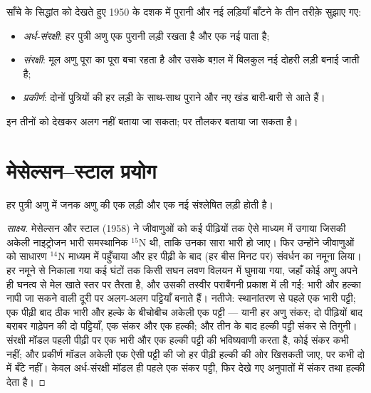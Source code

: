 \begin{example}[तीन संभव नतीजे]\label{ex:g11:dna-replication:models}
साँचे के सिद्धांत को देखते हुए 1950 के दशक में पुरानी और नई लड़ियाँ
बाँटने के तीन तरीक़े सुझाए गए:
\begin{itemize}
  \item \emph{अर्ध-संरक्षी}: हर पुत्री अणु एक पुरानी लड़ी रखता है और एक
        नई पाता है;
  \item \emph{संरक्षी}: मूल अणु पूरा का पूरा बचा रहता है और उसके बग़ल में
        बिलकुल नई दोहरी लड़ी बनाई जाती है;
  \item \emph{प्रकीर्ण}: दोनों पुत्रियों की हर लड़ी के साथ-साथ पुराने और
        नए खंड बारी-बारी से आते हैं।
\end{itemize}
इन तीनों को देखकर अलग नहीं बताया जा सकता; पर तौलकर बताया जा सकता है।
\end{example}

\section{मेसेल्सन--स्टाल प्रयोग}

\begin{proposition}[प्रतिकृतिकरण अर्ध-संरक्षी है]\label{prop:g11:dna-replication:semiconservative}
हर पुत्री  अणु में जनक अणु की एक लड़ी और एक नई संश्लेषित लड़ी होती है।
\end{proposition}
\begin{proof}[साक्ष्य]
मेसेल्सन और स्टाल (1958) ने जीवाणुओं को कई पीढ़ियों तक ऐसे माध्यम में
उगाया जिसकी अकेली नाइट्रोजन भारी समस्थानिक $^{15}$N थी, ताकि उनका सारा
 भारी हो जाए। फिर उन्होंने जीवाणुओं को साधारण $^{14}$N माध्यम में
पहुँचाया और हर पीढ़ी के बाद (हर बीस मिनट पर) संवर्धन का नमूना लिया। हर
नमूने से निकाला गया  कई घंटों तक किसी सघन लवण विलयन में घुमाया गया,
जहाँ कोई अणु अपने ही घनत्व से मेल खाते स्तर पर तैरता है, और उसकी तस्वीर
पराबैंगनी प्रकाश में ली गई: भारी और हल्का  नापी जा सकने वाली दूरी पर
अलग-अलग पट्टियाँ बनाते हैं। नतीजे: स्थानांतरण से पहले एक भारी पट्टी; एक
पीढ़ी बाद ठीक भारी और हल्के के बीचोबीच अकेली एक पट्टी --- यानी हर अणु
संकर; दो पीढ़ियों बाद बराबर गाढ़ेपन की दो पट्टियाँ, एक संकर और एक हल्की;
और तीन के बाद हल्की पट्टी संकर से तिगुनी। संरक्षी मॉडल पहली पीढ़ी पर एक
भारी और एक हल्की पट्टी की भविष्यवाणी करता है, कोई संकर कभी नहीं; और
प्रकीर्ण मॉडल अकेली एक ऐसी पट्टी की जो हर पीढ़ी हल्की की ओर खिसकती जाए,
पर कभी दो में बँटे नहीं। केवल अर्ध-संरक्षी मॉडल ही पहले एक संकर पट्टी,
फिर देखे गए अनुपातों में संकर तथा हल्की देता है।
\end{proof}

